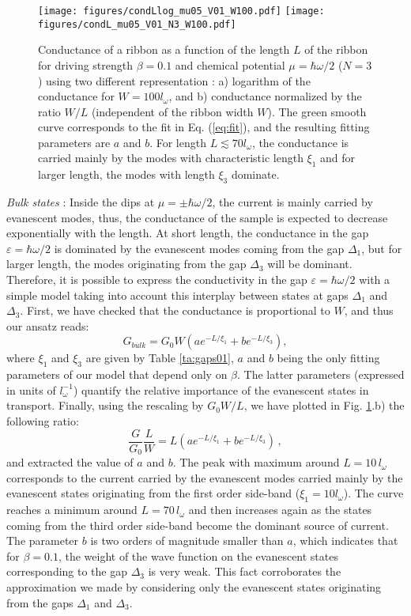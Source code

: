 \documentclass[aps,prb,showpacs,superscriptaddress,twocolumn,10pt,floatfix]{revtex4-1}
\newcommand{\ep}{\varepsilon}
\begin{document}
\begin{figure}[t!]
	\texttt{[image: figures/condLlog\_mu05\_V01\_W100.pdf]}
	\texttt{[image: figures/condL\_mu05\_V01\_N3\_W100.pdf]}
	\caption{Conductance of a ribbon as a function of the length $L$ of the ribbon for driving strength $\beta=0.1$ and chemical potential $\mu=\hbar\omega/2$ ($N=3$) using two different representation : a) logarithm of the conductance for $W=100l_\omega$, and b) conductance normalized by the ratio $W/L$ (independent of the ribbon width $W$). The green smooth curve corresponds to the fit in Eq. (\ref{eq:fit}), and the resulting fitting parameters are $a$ and $b$. For length  $L\lesssim70l_\omega$, the conductance is carried mainly by the modes with characteristic length $\xi_1$ and for larger length, the modes with length $\xi_3$ dominate.}
	\label{fig:condL_V01}
\end{figure}

\textit{Bulk states} : Inside the dips at $\mu=\pm\hbar\omega/2$, the current is mainly carried by evanescent modes, thus, the conductance of the sample is expected to decrease exponentially with the length. At short length, the conductance in the gap $\ep=\hbar\omega/2$ is dominated by the evanescent modes coming from the gap $\Delta_1$, but for larger length, the modes originating from the gap $\Delta_3$ will be dominant. Therefore, it is possible to express the conductivity in the gap $\ep=\hbar\omega/2$ with a simple model taking into account this interplay between states at gaps $\Delta_1$ and $\Delta_3$. First, we have checked that the conductance is proportional to $W$, and thus our ansatz reads:  
\begin{equation}
	G_{bulk} =G_0 W \left(a e^{-L/\xi_1}+b e^{-L/\xi_3}\right) ,
\label{eq:fit0}
\end{equation}
where $\xi_1$ and $\xi_3$ are given by Table \ref{ta:gaps01}, $a$ and $b$ being the only fitting parameters of our model that depend only on $\beta$. The latter parameters (expressed in units of $l_\omega^{-1}$) quantify the relative importance of the evanescent states in transport. Finally, using the rescaling by $G_0 W/L$, we have plotted in Fig. \ref{fig:condL_V01}.b) the following ratio: 
\begin{equation}
	\frac{G}{G_0} \frac{L}{W}=L \left(a e^{-L/\xi_1}+b e^{-L/\xi_3}\right) \,,
\label{eq:fit}
\end{equation}
and extracted the value of $a$ and $b$. The peak with maximum around $L=10 \, l_\omega$ corresponds to the current carried by the evanescent modes carried mainly by the evanescent states originating from the first order side-band ($\xi_1=10l_\omega$). The curve reaches a minimum around $L=70 \, l_\omega$ and then increases again as the states coming from the third order side-band become the dominant source of current. The parameter $b$ is two orders of magnitude smaller than $a$, which indicates that for $\beta=0.1$, the weight of the wave function on the evanescent states corresponding to the gap $\Delta_3$ is very weak. This fact corroborates the approximation we made by considering only the evanescent states originating from the gaps $\Delta_1$ and $\Delta_3$.
\end{document}
